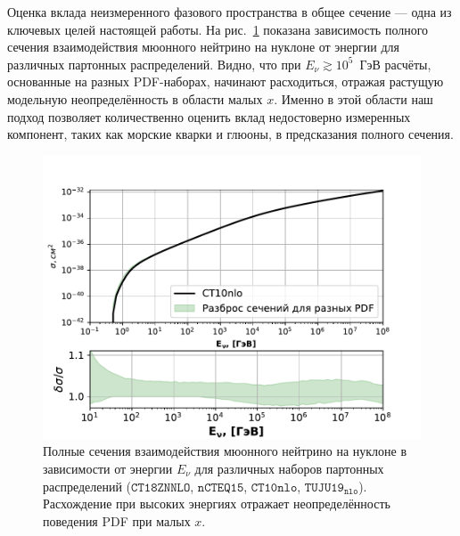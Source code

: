 Оценка вклада неизмеренного фазового пространства в общее сечение — одна из ключевых целей настоящей работы. На рис.~\ref{fig:xsec_total} показана зависимость полного сечения взаимодействия мюонного нейтрино на нуклоне от энергии для различных партонных распределений. Видно, что при $E_\nu \gtrsim 10^5$~ГэВ расчёты, основанные на разных PDF-наборах, начинают расходиться, отражая растущую модельную неопределённость в области малых $x$. Именно в этой области наш подход позволяет количественно оценить вклад недостоверно измеренных компонент, таких как морские кварки и глюоны, в предсказания полного сечения.


\begin{figure}[!h]
\centering
\includegraphics[width=\linewidth]{images/NuProp/xs_vs_enu.pdf}
\caption{Полные сечения взаимодействия мюонного нейтрино на нуклоне в зависимости от энергии $E_\nu$ для различных наборов партонных распределений ($\texttt{CT18ZNNLO}$, $\texttt{nCTEQ15}$, $\texttt{CT10nlo}$, $\texttt{TUJU19}_\texttt{nlo}$). Расхождение при высоких энергиях отражает неопределённость поведения PDF при малых $x$.} 
\label{fig:xsec_total}
\end{figure}
